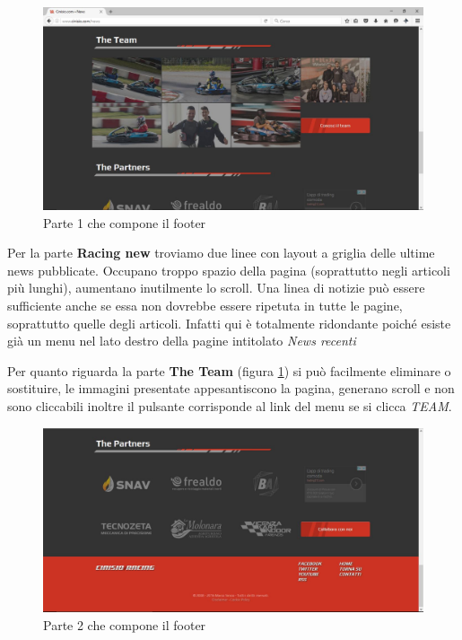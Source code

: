 		\begin{figure} [h]
			\includegraphics[width=\textwidth]{images/Footer_Part1}
			\caption{Parte 1 che compone il footer}
			\label{fig:Footer1}
		\end{figure}
		
		Per la parte \textbf{Racing new} troviamo due linee con layout a griglia delle ultime news pubblicate. Occupano troppo spazio della pagina (soprattutto negli articoli più lunghi), aumentano inutilmente lo scroll. Una linea di notizie può essere sufficiente anche se essa non dovrebbe essere ripetuta in tutte le pagine, soprattutto quelle degli articoli. Infatti qui è totalmente ridondante poiché esiste già un menu nel lato destro della pagine intitolato \textit{News recenti}
		
		Per quanto riguarda la parte \textbf{The Team} (figura \ref{fig:Footer1}) si può facilmente eliminare o sostituire, le immagini presentate appesantiscono la pagina, generano scroll e non sono cliccabili inoltre il pulsante corrisponde al link del menu se si clicca \textit{TEAM}.
		
		\begin{figure} [h]
			\includegraphics[width=\textwidth]{images/Footer_Part2}
			\caption{Parte 2 che compone il footer}
			\label{fig:Footer2}
		\end{figure}
				

